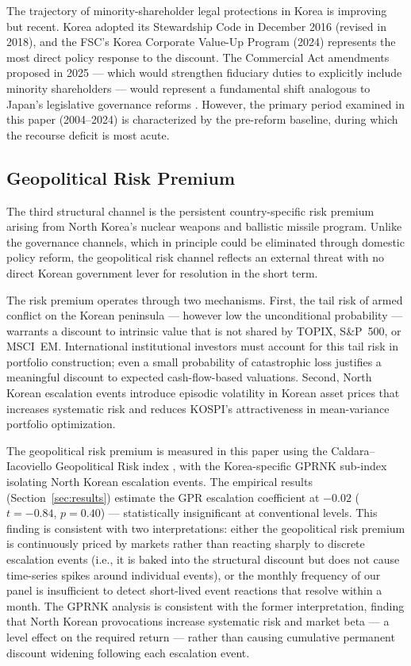 \documentclass[12pt]{article}
\begin{document}
The trajectory of minority-shareholder legal protections in Korea is improving but recent.
Korea adopted its Stewardship Code in December 2016 (revised in 2018), and the FSC's
Korea Corporate Value-Up Program (2024) represents the most direct policy response to the
discount. The Commercial Act amendments proposed in 2025 --- which would strengthen fiduciary
duties to explicitly include minority shareholders --- would represent a fundamental shift
analogous to Japan's legislative governance reforms \citep{porta1998, porta2002}. However,
the primary period examined in this paper (2004--2024) is characterized by the pre-reform
baseline, during which the recourse deficit is most acute.

\subsection{Geopolitical Risk Premium}

The third structural channel is the persistent country-specific risk premium arising from
North Korea's nuclear weapons and ballistic missile program. Unlike the governance channels,
which in principle could be eliminated through domestic policy reform, the geopolitical risk
channel reflects an external threat with no direct Korean government lever for resolution
in the short term.

The risk premium operates through two mechanisms. First, the tail risk of armed conflict on
the Korean peninsula --- however low the unconditional probability --- warrants a discount to
intrinsic value that is not shared by TOPIX, S\&P~500, or MSCI~EM. International institutional
investors must account for this tail risk in portfolio construction; even a small probability
of catastrophic loss justifies a meaningful discount to expected cash-flow-based valuations.
Second, North Korean escalation events introduce episodic volatility in Korean asset prices
that increases systematic risk and reduces KOSPI's attractiveness in mean-variance portfolio
optimization.

The geopolitical risk premium is measured in this paper using the Caldara--Iacoviello
Geopolitical Risk index \citep{caldara2022}, with the Korea-specific GPRNK sub-index
isolating North Korean escalation events. The empirical results (Section~\ref{sec:results})
estimate the GPR escalation coefficient at $-0.02$ ($t = -0.84$, $p = 0.40$) --- statistically
insignificant at conventional levels. This finding is consistent with two interpretations:
either the geopolitical risk premium is continuously priced by markets rather than reacting
sharply to discrete escalation events (i.e., it is baked into the structural discount but
does not cause time-series spikes around individual events), or the monthly frequency of our
panel is insufficient to detect short-lived event reactions that resolve within a month.
The \citet{imf2021} GPRNK analysis is consistent with the former interpretation, finding
that North Korean provocations increase systematic risk and market beta --- a level effect
on the required return --- rather than causing cumulative permanent discount widening
following each escalation event.
\end{document}
